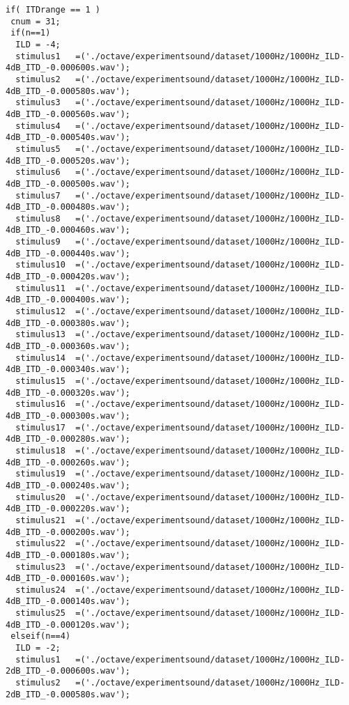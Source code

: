 {\begin{verbatim}
if( ITDrange == 1 )
 cnum = 31;
 if(n==1)
  ILD = -4;
  stimulus1   =('./octave/experimentsound/dataset/1000Hz/1000Hz_ILD-4dB_ITD_-0.000600s.wav');
  stimulus2   =('./octave/experimentsound/dataset/1000Hz/1000Hz_ILD-4dB_ITD_-0.000580s.wav');
  stimulus3   =('./octave/experimentsound/dataset/1000Hz/1000Hz_ILD-4dB_ITD_-0.000560s.wav');
  stimulus4   =('./octave/experimentsound/dataset/1000Hz/1000Hz_ILD-4dB_ITD_-0.000540s.wav');
  stimulus5   =('./octave/experimentsound/dataset/1000Hz/1000Hz_ILD-4dB_ITD_-0.000520s.wav');
  stimulus6   =('./octave/experimentsound/dataset/1000Hz/1000Hz_ILD-4dB_ITD_-0.000500s.wav');
  stimulus7   =('./octave/experimentsound/dataset/1000Hz/1000Hz_ILD-4dB_ITD_-0.000480s.wav');
  stimulus8   =('./octave/experimentsound/dataset/1000Hz/1000Hz_ILD-4dB_ITD_-0.000460s.wav');
  stimulus9   =('./octave/experimentsound/dataset/1000Hz/1000Hz_ILD-4dB_ITD_-0.000440s.wav');
  stimulus10  =('./octave/experimentsound/dataset/1000Hz/1000Hz_ILD-4dB_ITD_-0.000420s.wav');
  stimulus11  =('./octave/experimentsound/dataset/1000Hz/1000Hz_ILD-4dB_ITD_-0.000400s.wav');
  stimulus12  =('./octave/experimentsound/dataset/1000Hz/1000Hz_ILD-4dB_ITD_-0.000380s.wav');
  stimulus13  =('./octave/experimentsound/dataset/1000Hz/1000Hz_ILD-4dB_ITD_-0.000360s.wav');
  stimulus14  =('./octave/experimentsound/dataset/1000Hz/1000Hz_ILD-4dB_ITD_-0.000340s.wav');
  stimulus15  =('./octave/experimentsound/dataset/1000Hz/1000Hz_ILD-4dB_ITD_-0.000320s.wav');
  stimulus16  =('./octave/experimentsound/dataset/1000Hz/1000Hz_ILD-4dB_ITD_-0.000300s.wav');
  stimulus17  =('./octave/experimentsound/dataset/1000Hz/1000Hz_ILD-4dB_ITD_-0.000280s.wav');
  stimulus18  =('./octave/experimentsound/dataset/1000Hz/1000Hz_ILD-4dB_ITD_-0.000260s.wav');
  stimulus19  =('./octave/experimentsound/dataset/1000Hz/1000Hz_ILD-4dB_ITD_-0.000240s.wav');
  stimulus20  =('./octave/experimentsound/dataset/1000Hz/1000Hz_ILD-4dB_ITD_-0.000220s.wav');
  stimulus21  =('./octave/experimentsound/dataset/1000Hz/1000Hz_ILD-4dB_ITD_-0.000200s.wav');
  stimulus22  =('./octave/experimentsound/dataset/1000Hz/1000Hz_ILD-4dB_ITD_-0.000180s.wav');
  stimulus23  =('./octave/experimentsound/dataset/1000Hz/1000Hz_ILD-4dB_ITD_-0.000160s.wav');
  stimulus24  =('./octave/experimentsound/dataset/1000Hz/1000Hz_ILD-4dB_ITD_-0.000140s.wav');
  stimulus25  =('./octave/experimentsound/dataset/1000Hz/1000Hz_ILD-4dB_ITD_-0.000120s.wav');
 elseif(n==4)
  ILD = -2;
  stimulus1   =('./octave/experimentsound/dataset/1000Hz/1000Hz_ILD-2dB_ITD_-0.000600s.wav');
  stimulus2   =('./octave/experimentsound/dataset/1000Hz/1000Hz_ILD-2dB_ITD_-0.000580s.wav');

\end{verbatim}}

